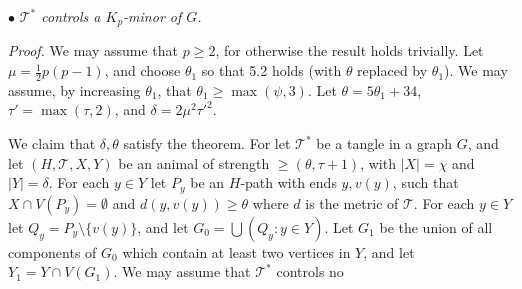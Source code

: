 \hspace*{12pt}$\bullet$ \textit{$\mathcal{T}^*$ controls a $K_p$-minor of $G$.}

\textit{Proof.} We may assume that $p \ge 2$, for otherwise the result holds trivially. Let $\mu = \frac{1}{2}p(p - 1)$, and choose $\theta_1$ so that 5.2 holds (with $\theta$ replaced by $\theta_1$). We may assume, by increasing $\theta_1$, that $\theta_1 \ge \max(\psi, 3)$. Let $\theta = 5\theta_1 + 34$, $\tau' = \max(\tau, 2)$, and $\delta = 2\mu^2 \tau'^2$.

We claim that $\delta, \theta$ satisfy the theorem. For let $\mathcal{T}^*$ be a tangle in a graph $G$, and let $(H, \mathcal{T}, X, Y)$ be an animal of strength $\ge (\theta, \tau + 1)$, with $|X| = \chi$ and $|Y| = \delta$. For each $y \in Y$ let $P_y$ be an $H$-path with ends $y, v(y)$, such that $X \cap V(P_y) = \emptyset$ and $d(y, v(y)) \ge \theta$ where $d$ is the metric of $\mathcal{T}$. For each $y \in Y$ let $Q_y = P_y \setminus \{v(y)\}$, and let $G_0 = \bigcup (Q_y : y \in Y)$. Let $G_1$ be the union of all components of $G_0$ which contain at least two vertices in $Y$, and let $Y_1 = Y \cap V(G_1)$. We may assume that $\mathcal{T}^*$ controls no
